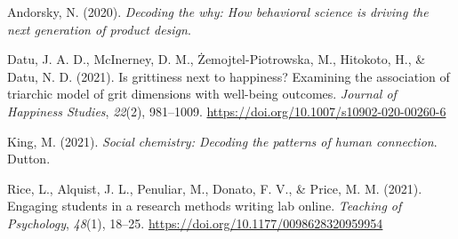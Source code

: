 \documentclass[12pt,
  a4paper,
  landscape]{article}
\newlength{\cslhangindent}
\newenvironment{CSLReferences}[2] %
 {%
  \setlength{\parindent}{0pt}
  \ifodd #1 \everypar{\setlength{\hangindent}{\cslhangindent}}\ignorespaces\fi
  \ifnum #2 > 0
  \setlength{\parskip}{#2\baselineskip}
  \fi
 }%
 {}
\begin{document}
\hypertarget{refs}{}
\begin{CSLReferences}{1}{0}
\leavevmode{}%
Andorsky, N. (2020). \emph{Decoding the why: How behavioral science is
driving the next generation of product design}.

\leavevmode{}%
Datu, J. A. D., McInerney, D. M., Żemojtel-Piotrowska, M., Hitokoto, H.,
\& Datu, N. D. (2021). Is grittiness next to happiness? Examining the
association of triarchic model of grit dimensions with well-being
outcomes. \emph{Journal of Happiness Studies}, \emph{22}(2), 981--1009.
\url{https://doi.org/10.1007/s10902-020-00260-6}

\leavevmode{}%
King, M. (2021). \emph{Social chemistry: Decoding the patterns of human
connection}. Dutton.

\leavevmode{}%
Rice, L., Alquist, J. L., Penuliar, M., Donato, F. V., \& Price, M. M.
(2021). Engaging students in a research methods writing lab online.
\emph{Teaching of Psychology}, \emph{48}(1), 18--25.
\url{https://doi.org/10.1177/0098628320959954}

\end{CSLReferences}
\end{document}

